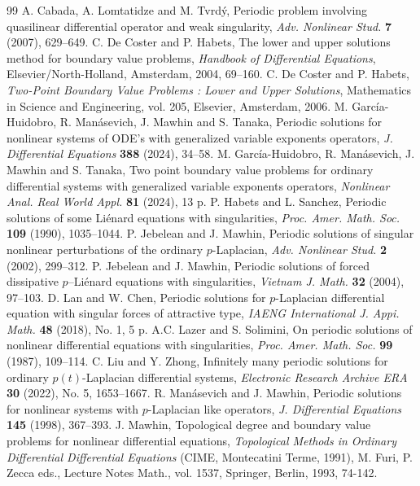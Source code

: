 \documentclass[11pt]{amsart}
\numberwithin{equation}{section} \textwidth=15.5cm
\begin{document}
\begin{thebibliography}{99}
\bibitem{[CLT]} A. Cabada, A. Lomtatidze and M. Tvrd\'y, Periodic problem involving quasilinear differential operator and weak singularity, \textit{Adv. Nonlinear Stud.} {\bf 7}  (2007), 629--649.
\bibitem{[CoHa]} C. De Coster and P. Habets, The lower and upper solutions method for boundary value problems, \textit{Handbook of Differential Equations}, Elsevier/North-Holland, Amsterdam, 2004, 69--160.
 C. De Coster and P. Habets, \textit{Two-Point Boundary Value Problems : Lower and Upper Solutions}, Mathematics in Science and Engineering, vol. 205, Elsevier, Amsterdam, 2006.
\bibitem{[HMMT]} M. Garc\'{i}a-Huidobro, R. Man\'{a}sevich, J. Mawhin and S. Tanaka, Periodic solutions for nonlinear systems of ODE's with generalized variable exponents operators, \textit{J. Differential Equations} {\bf 388} (2024), 34--58.
\bibitem{[HMMT1]} M. Garc\'{i}a-Huidobro, R. Man\'{a}sevich, J. Mawhin and S. Tanaka, Two point boundary value problems for ordinary differential systems with generalized variable exponents operators, \textit{Nonlinear Anal. Real World Appl.} {\bf 81} (2024), 13 p.
\bibitem{[HaSa]} P. Habets and L. Sanchez, Periodic solutions of some Li\'{e}nard equations with singularities, \textit{Proc. Amer. Math. Soc.} {\bf 109} (1990), 1035--1044.
\bibitem{[JMANS]} P. Jebelean and J. Mawhin, Periodic solutions of singular nonlinear perturbations of the ordinary $p$-Laplacian, \textit{ Adv. Nonlinear Stud.} {\bf 2} (2002), 299--312.
\bibitem{[JMVJM]} P. Jebelean and J. Mawhin, Periodic solutions of forced dissipative  $p$--Li\'{e}nard equations with singularities, \textit{ Vietnam J. Math.} {\bf 32} (2004), 97--103.
\bibitem{[LaC]} D. Lan and W. Chen, Periodic solutions for $p$-Laplacian differential equation with singular forces of attractive type, \textit{IAENG International J. Appi. Math.} {\bf 48} (2018), No. 1, 5 p.
\bibitem{[LaSo]} A.C. Lazer and S. Solimini, On periodic solutions of nonlinear differential equations with singularities, \textit{Proc. Amer. Math. Soc.} {\bf 99} (1987), 109--114.
\bibitem{[LiZ]} C. Liu and Y. Zhong, Infinitely many periodic solutions for ordinary $p(t)$-Laplacian differential systems, \textit{Electronic Research Archive ERA} {\bf 30} (2022), No. 5, 1653--1667.
\bibitem{[MaM]} R. Man\'asevich and J. Mawhin, Periodic solutions for nonlinear systems with $p$-Laplacian like operators, {\em J. Differential Equations} {\bf 145} (1998), 367--393.
\bibitem{[Maw93]} J. Mawhin, Topological degree and boundary value problems for nonlinear differential equations, \textit{Topological Methods in Ordinary Differential Differential Equations} (CIME, Montecatini Terme, 1991), M. Furi, P. Zecca eds., Lecture Notes Math., vol. 1537, Springer, Berlin, 1993, 74-142.

\end{thebibliography}
\end{document}
